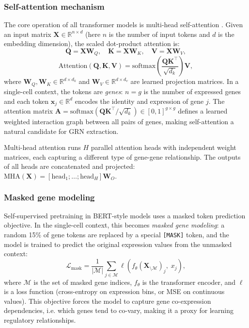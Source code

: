\subsubsection{Self-attention mechanism}
The core operation of all transformer models is multi-head self-attention
\cite{devlinBERTPretrainingDeep2019}. Given an input matrix
\(\mathbf{X} \in \mathbb{R}^{n \times d}\) (here \(n\) is the number of input tokens and \(d\)
is the embedding dimension), the scaled dot-product attention \cite{vaswaniAttentionAllYou2023} is:
\begin{equation}
  \mathbf{Q} = \mathbf{X}\mathbf{W}_Q, \quad
  \mathbf{K} = \mathbf{X}\mathbf{W}_K, \quad
  \mathbf{V} = \mathbf{X}\mathbf{W}_V,
\end{equation}
\begin{equation}
  \text{Attention}(\mathbf{Q}, \mathbf{K}, \mathbf{V})
  = \text{softmax}\!\left(\frac{\mathbf{Q}\mathbf{K}^\top}{\sqrt{d_k}}\right)\mathbf{V},
\end{equation}
where \(\mathbf{W}_Q, \mathbf{W}_K \in \mathbb{R}^{d \times d_k}\) and
\(\mathbf{W}_V \in \mathbb{R}^{d \times d_v}\) are learned projection matrices. In a single-cell
context, the tokens are \emph{genes}: \(n = g\) is the number of expressed genes and each token
\(\mathbf{x}_j \in \mathbb{R}^d\) encodes the identity and expression of gene \(j\). The attention
matrix \(\mathbf{A} = \text{softmax}(\mathbf{Q}\mathbf{K}^\top/\sqrt{d_k}) \in [0,1]^{g \times g}\)
defines a learned weighted interaction graph between all pairs of genes, making self-attention a
natural candidate for \gls{GRN} extraction.

Multi-head attention runs \(H\) parallel attention heads with independent weight matrices, each
capturing a different type of gene-gene relationship. The outputs of all heads are concatenated and
projected: \(\text{MHA}(\mathbf{X}) = [\text{head}_1;\ldots;\text{head}_H]\mathbf{W}_O\).

\subsubsection{Masked gene modeling}
Self-supervised pretraining in \gls{BERT}-style models uses a masked token prediction objective.
In the single-cell context, this becomes \emph{masked gene modeling}\cite{yangScBERTLargescalePretrained2022a}: a random 15\% of gene tokens
are replaced by a special \texttt{[MASK]} token, and the model is trained to predict the original
expression values from the unmasked context:
\begin{equation}
  \mathcal{L}_\text{mask} = \frac{1}{|\mathcal{M}|} \sum_{j \in \mathcal{M}}
  \ell\!\left( f_\theta(\mathbf{X}_{\setminus \mathcal{M}})_j,\; x_j \right),
\end{equation}
where \(\mathcal{M}\) is the set of masked gene indices, \(f_\theta\) is the transformer encoder,
and \(\ell\) is a loss function (cross-entropy on expression bins, or MSE on continuous values).
This objective forces the model to capture gene co-expression dependencies, i.e. which genes tend to
co-vary, making it a proxy for learning regulatory relationships.


